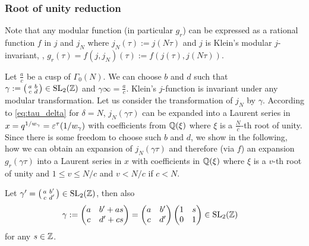 \documentclass{article}
\begin{document}
\begin{Hemmecke}



\subsubsection{Root of unity reduction}

Note that any modular function (in particular $g_r$) can be expressed
as a rational function $f$ in $j$ and $j_N$ where
$j_N(\tau):=j(N\tau)$ and $j$ is Klein's modular $j$-invariant, \ie,
$g_r(\tau)=f(j, j_N)(\tau) := f(j(\tau), j(N\tau))$.

Let $\frac{a}{c}$ be a cusp of $\Gamma_0(N)$.
%
We can choose $b$ and $d$ such that
%
$\gamma := \bigl(
\begin{smallmatrix}
  a & b\\
  c & d
\end{smallmatrix}
\bigr) \in \SL2Z$ and $\gamma\infty=\frac{a}{c}$.
%
Klein's $j$-function is invariant under any modular transformation.
%
Let us consider the transformation of $j_N$ by $\gamma$.
%
According to \eqref{eq:tau_delta} for $\delta=N$, $j_N(\gamma\tau)$
can be expanded into a Laurent series in
$x=q^{1/w_\gamma}=\varepsilon^\tau\!\left(1/w_\gamma\right)$ with
coefficients from $\mathbb{Q}(\xi)$ where $\xi$ is a $\frac{N}{c}$-th root
of unity.
%
Since there is some freedom to choose such $b$ and $d$, we show in the
following, how we can obtain an expansion of $j_N(\gamma\tau)$ and
therefore (via $f$) an expansion $g_r(\gamma\tau)$ into a Laurent
series in $x$ with coefficients in $\mathbb{Q}(\xi)$ where $\xi$ is a
$v$-th root of unity and $1 \leq v \le N/c$ and $v<N/c$ if $c<N$.

Let
$\gamma' = \bigl(
\begin{smallmatrix}
  a & b'\\
  c & d'
\end{smallmatrix}
\bigr) \in \SL2Z$, then also
\begin{align*}
  \gamma
  &:=
    \begin{pmatrix}
      a & b' + as\\
      c & d' + cs
    \end{pmatrix}
  =
    \begin{pmatrix}
      a & b'\\
      c & d'
    \end{pmatrix}
    \begin{pmatrix}
      1 & s\\
      0 & 1
    \end{pmatrix}
    \in \SL2Z
\end{align*}
for any $s\in\mathbb{Z}$.


\end{Hemmecke}
\end{document}
